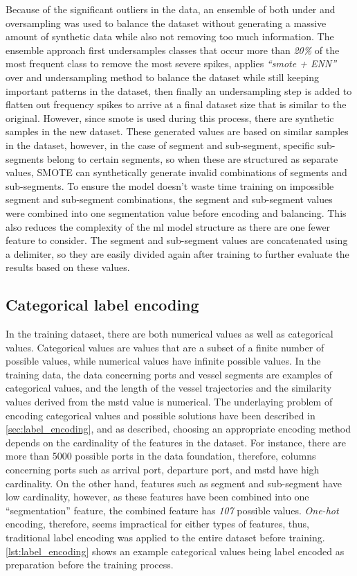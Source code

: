 Because of the significant outliers in the data, an ensemble of both under and oversampling was used to balance the dataset without generating a massive amount of synthetic data while also not removing too much information. The ensemble approach first undersamples classes that occur more than \textit{20\%} of the most frequent class to remove the most severe spikes, applies \textit{``\acrshort{smote} + ENN''} over and undersampling method to balance the dataset while still keeping important patterns in the dataset, then finally an undersampling step is added to flatten out frequency spikes to arrive at a final dataset size that is similar to the original. However, since \acrshort{smote} is used during this process, there are synthetic samples in the new dataset. These generated values are based on similar samples in the dataset, however, in the case of segment and sub-segment, specific sub-segments belong to certain segments, so when these are structured as separate values, SMOTE can synthetically generate invalid combinations of segments and sub-segments. To ensure the model doesn't waste time training on impossible segment and sub-segment combinations, the segment and sub-segment values were combined into one segmentation value before encoding and balancing. This also reduces the complexity of the \acrshort{ml} model structure as there are one fewer feature to consider. The segment and sub-segment values are concatenated using a delimiter, so they are easily divided again after training to further evaluate the results based on these values.

\subsection{Categorical label encoding}

In the training dataset, there are both numerical values as well as categorical values. Categorical values are values that are a subset of a finite number of possible values, while numerical values have infinite possible values. In the training data, the data concerning ports and vessel segments are examples of categorical values, and the length of the vessel trajectories and the similarity values derived from the \acrshort{mstd} value is numerical. The underlaying problem of encoding categorical values and possible solutions have been described in \cref{sec:label_encoding}, and as described, choosing an appropriate encoding method depends on the cardinality of the features in the dataset. For instance, there are more than 5000 possible ports in the data foundation, therefore, columns concerning ports such as arrival port, departure port, and \acrshort{mstd} have high cardinality. On the other hand, features such as segment and sub-segment have low cardinality, however, as these features have been combined into one ``segmentation'' feature, the combined feature has \textit{107} possible values. \textit{One-hot} encoding, therefore, seems impractical for either types of features, thus, traditional label encoding was applied to the entire dataset before training. \cref{lst:label_encoding} shows an example categorical values being label encoded as preparation before the training process.


